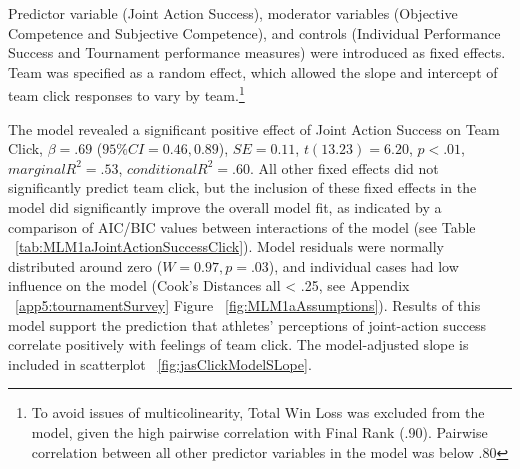 \begin{landscape}
Predictor variable (Joint Action Success), moderator variables (Objective Competence and Subjective Competence), and controls (Individual Performance Success and Tournament performance measures) were introduced as fixed effects.   Team was specified as a random effect, which allowed the slope and intercept of team click responses to vary by team.\footnote{To avoid issues of multicolinearity, Total Win Loss was excluded from the model, given the high pairwise correlation with Final Rank (.90). Pairwise correlation between all other predictor variables in the model was below .80}

The model revealed a significant positive effect of Joint Action Success on Team Click, $\beta = .69$ ($95\% CI =  0.46, 0.89$), $SE = 0.11$, $t(13.23) = 6.20$, $p < .01$, $marginal R^2 = .53$, $conditional R^2 = .60$. All other fixed effects did not significantly predict team click, but the inclusion of these fixed effects in the model did significantly improve the overall model fit, as indicated by a comparison of AIC/BIC values between interactions of the model (see Table ~\ref{tab:MLM1aJointActionSuccessClick}).  Model residuals were normally distributed around zero ($W = 0.97, p = .03$), and individual cases had low influence on the model (Cook's Distances all < .25, see Appendix ~\ref{app5:tournamentSurvey} Figure ~\ref{fig:MLM1aAssumptions}). Results of this model support the prediction that athletes' perceptions of joint-action success correlate positively with feelings of team click.  The model-adjusted slope is included in scatterplot ~\ref{fig:jasClickModelSLope}.






\end{landscape}
